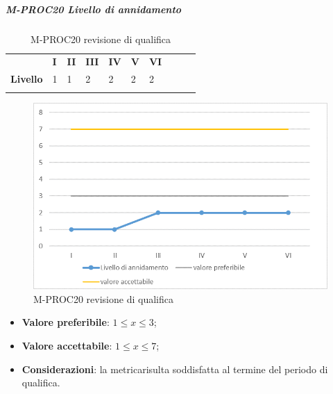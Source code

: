 \subparagraph{M-PROC20 Livello di annidamento} \mbox{}
\begin{longtable}[H!] {						
		>{}p{50mm}  		
		>{}p{8mm}
		>{}p{8mm}		
		>{}p{8mm}		
		>{}p{8mm}		
		>{}p{8mm}		
		>{}p{8mm}
		>{}p{8mm}
		>{}p{8mm}
		>{}p{8mm}
	}
	\rowcolor{gray!50}
	\textbf{} & \textbf{I} & \textbf{II} & \textbf{III} & \textbf{IV} & \textbf{V} & \textbf{VI} \TBstrut \\ [2mm]
	\textbf{Livello} & 1 & 1 & 2 & 2 & 2 & 2 \TBstrut \\ [2mm]
	\rowcolor{white}
	\caption{M-PROC20 revisione di qualifica}
\end{longtable}
\begin{figure}[H] 	
	\includegraphics[width=\linewidth]{./img/grafici/RQ20.png}	
	\caption{M-PROC20 revisione di qualifica}	
\end{figure}
\begin{itemize}
	\item \textbf{Valore preferibile}: $1\le x \le 3$;
	\item \textbf{Valore accettabile}: $1 \le x \le 7$;
	\item \textbf{Considerazioni}: la metrica\glosp risulta soddisfatta al termine del periodo di qualifica.
\end{itemize}
